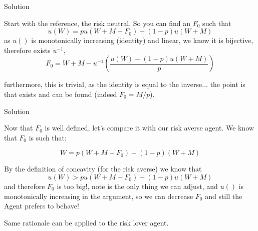 \documentclass[aspectratio=169]{beamer}
\begin{document}
\begin{frame}{Solution}
    
    Start with the reference, the risk neutral. So you can find an $F_0$ such that $$u(W) = p u(W+M-F_0) + (1-p) u(W+M)$$ as $u()$ is monotonically increasing (identity) and linear, we know it is bijective, therefore exists $u^{-1}$, $$F_0 = W+M-u^{-1}\left(\frac{u(W)-(1-p)u(W+M)}{p}\right)$$
    
    furthermore, this is trivial, as the identity is equal to the inverse... the point is that exists and can be found (indeed $F_0 = M/p$).
    
\end{frame}

\begin{frame}{Solution}

    Now that $F_0$ is well defined, let's compare it with our risk averse agent. We know that $F_0$ is such that:
    
    $$ W = p (W+M-F_0) + (1-p)(W+M)$$
    
    \vspace{0.5cm}
    
    By the definition of concavity (for the risk averse) we know that $$ u(W) > p u(W+M-F_0) + (1-p)u(W+M)$$ and therefore $F_0$ is too big!, note is the only thing we can adjust, and $u()$ is monotonically increasing in the argument, so we can decrease $F_0$ and still the Agent prefers to behave!
    
    Same rationale can be applied to the risk lover agent.
    
\end{frame}
\end{document}
